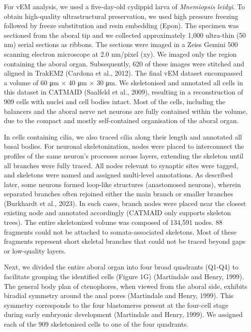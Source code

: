 \documentclass[
  11pt,
]{article}
\begin{document}
For vEM analysis, we used a five-day-old cydippid larva of
\emph{Mnemiopsis leidyi}. To obtain high-quality ultrastructural
preservation, we used high pressure freezing followed by freeze
substitution and resin embedding (Epon). The specimen was sectioned from
the aboral tip and we collected approximately 1,000 ultra-thin (50 nm)
serial sections as ribbons. The sections were imaged in a Zeiss Gemini
500 scanning electron microscope at 2.0 nm/pixel (xy). We imaged only
the region containing the aboral organ. Subsequently, 620 of these
images were stitched and aligned in TrakEM2 (Cardona et al., 2012). The
final vEM dataset encompassed a volume of 60 μm × 40 μm × 30 μm. We
skeletonised and annotated all cells in this dataset in CATMAID
(Saalfeld et al., 2009), resulting in a reconstruction of 909 cells with
nuclei and cell bodies intact. Most of the cells, including the
balancers and the aboral nerve net neurons are fully contained within
the volume, due to the compact and mostly self-contained organisation of
the aboral organ.

In cells containing cilia, we also traced cilia along their length and
annotated all basal bodies. For neuronal skeletonization, nodes were
placed to interconnect the profiles of the same neuron's processes
across layers, extending the skeleton until all branches were fully
traced. All nodes relevant to synaptic sites were tagged, and skeletons
were named and assigned multi-level annotations. As described later,
some neurons formed loop-like structures (anastomosed neurons), wherein
separated branches often rejoined either the main branch or smaller
branches (Burkhardt et al., 2023). In such cases, branch nodes were
placed near the closest existing node and annotated accordingly (CATMAID
only supports skeleton trees). The entire skeletonized volume was
composed of 134,591 nodes. 88 fragments could not be attached to
somata-associated skeletons. Most of these fragments represent short
skeletal branches that could not be traced beyond gaps or low-quality
layers.

Next, we divided the entire aboral organ into four broad quadrants
(Q1-Q4) to facilitate grouping the identified cells (Figure 1G)
(Martindale and Henry, 1999). The general body plan of ctenophores, when
viewed from the aboral side, exhibits biradial symmetry around the anal
pores (Martindale and Henry, 1999). This symmetry corresponds to the
four blastomeres present at the four-cell stage during early embryonic
development (Martindale and Henry, 1999). We assigned each of the 909
skeletonised cells to one of the four quadrants.
\end{document}
